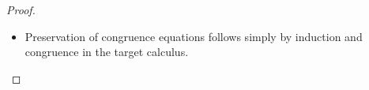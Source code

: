 \begin{proof}
\begin{itemize}
    \begin{align*}
      \begin{array}{rl}
        &  \textcolor{LGcolor}{\llparenthesis} \smidge   \textsf{push}_\oplus   \textcolor{coeffectColor}{[}   \mathsf{inj}_2 \,  \SYSTEMnt{t}   \textcolor{coeffectColor}{]}    \smidge \textcolor{LGcolor}{\rrparenthesis}  \\
        \textit{\{defn. translation\}} & =  \mathsf{let} \, \textcolor{coeffectColor}{[}  \SYSTEMmv{x}  \textcolor{coeffectColor}{]} =   \textcolor{coeffectColor}{[}   \mathsf{inj}_2 \,   \textcolor{LGcolor}{\llparenthesis} \smidge  \SYSTEMnt{t}  \smidge \textcolor{LGcolor}{\rrparenthesis}    \textcolor{coeffectColor}{]}   \, \mathsf{in} \,   \mathsf{case} \,  \SYSTEMmv{x}  \, \mathsf{of} \, \{ \mathsf{inj1} \,  \SYSTEMmv{y}  \rightarrow   \mathsf{inj}_1 \,   \textcolor{coeffectColor}{[}  \SYSTEMmv{y}  \textcolor{coeffectColor}{]}    ; \, \mathsf{inj2} \,  \SYSTEMmv{z}  \rightarrow   \mathsf{inj}_2 \,   \textcolor{coeffectColor}{[}  \SYSTEMmv{z}  \textcolor{coeffectColor}{]}    \}   \\
        \textit{\{\SYSTEMRenameRuleGradMEqbetaBox \}} &  \equiv_{\textsc{g} }   \mathsf{case} \,   \mathsf{inj}_2 \,   \textcolor{LGcolor}{\llparenthesis} \smidge  \SYSTEMnt{t}  \smidge \textcolor{LGcolor}{\rrparenthesis}    \, \mathsf{of} \, \{ \mathsf{inj1} \,  \SYSTEMmv{y}  \rightarrow   \mathsf{inj}_1 \,   \textcolor{coeffectColor}{[}  \SYSTEMmv{y}  \textcolor{coeffectColor}{]}    ; \, \mathsf{inj2} \,  \SYSTEMmv{z}  \rightarrow   \mathsf{inj}_2 \,   \textcolor{coeffectColor}{[}  \SYSTEMmv{z}  \textcolor{coeffectColor}{]}    \}  \\
        \textit{\{\SYSTEMRenameRuleGradEqbetaSumTwo{}\}} &  \equiv_{\textsc{g} }   \mathsf{inj}_2 \,   \textcolor{coeffectColor}{[}   \textcolor{LGcolor}{\llparenthesis} \smidge  \SYSTEMnt{t}  \smidge \textcolor{LGcolor}{\rrparenthesis}   \textcolor{coeffectColor}{]}   \\
        \textit{\{defn. translation\}} & =  \textcolor{LGcolor}{\llparenthesis} \smidge   \mathsf{inj}_2 \,   \textcolor{coeffectColor}{[}  \SYSTEMnt{t}  \textcolor{coeffectColor}{]}    \smidge \textcolor{LGcolor}{\rrparenthesis} 
      \end{array}
    \end{align*}

  \item Preservation of congruence equations follows simply by induction and congruence
    in the target calculus.


  \end{itemize}
\end{proof}
